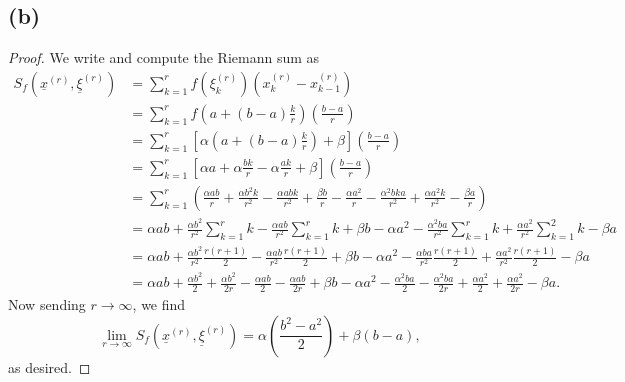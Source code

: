 \documentclass{article}
\begin{document}
\subsection*{(b)}
\begin{proof}
	We write and compute the Riemann sum as
	\begin{align}
		S_f\left(\underline{x}^{(r)}, \underline{\xi}^{(r)}\right) &= \sum_{k=1}^r f\left(\xi_k^{(r)}\right)\left(x_k^{(r)} - x_{k-1}^{(r)}\right) \\
		&= \sum_{k=1}^r f\left(a + (b-a)\frac{k}{r}\right)\left(\frac{b-a}{r}\right) \\
		&= \sum_{k=1}^r \left[\alpha \left(a + (b-a)\frac{k}{r}\right) + \beta\right]\left(\frac{b-a}{r}\right) \\
		&= \sum_{k=1}^r \left[\alpha a + \alpha \frac{bk}{r} - \alpha \frac{ak}{r} + \beta\right] \left(\frac{b-a}{r}\right) \\
		&= \sum_{k=1}^r \left(\frac{\alpha a b}{r} + \frac{\alpha b^2 k}{r^2} - \frac{\alpha a b k}{r^2} + \frac{\beta b}{r} - \frac{\alpha a^2}{r} - \frac{\alpha^2 b k a}{r^2} + \frac{\alpha a^2 k}{r^2} - \frac{\beta a}{r}\right)\\
		&= \alpha a b + \frac{\alpha b^2}{r^2}\sum_{k=1}^r k - \frac{\alpha a b}{r^2}\sum_{k=1}^r k + \beta b - \alpha a^2 - \frac{\alpha^2 b a}{r^2}\sum_{k=1}^r k + \frac{\alpha a^2}{r^2}\sum_{k=1}^2 k - \beta a \\
		&= \alpha a b + \frac{\alpha b^2}{r^2}\frac{r(r+1)}{2} - \frac{\alpha a b}{r^2}\frac{r(r+1)}{2} + \beta b - \alpha a^2 - \frac{\alpha b a}{r^2}\frac{r(r+1)}{2} + \frac{\alpha a^2}{r^2}\frac{r(r+1)}{2} - \beta a \\
		&= \alpha a b + \frac{\alpha b^2}{2} + \frac{\alpha b^2}{2 r} - \frac{\alpha a b}{2} - \frac{\alpha a b}{2 r} + \beta b - \alpha a^2 - \frac{\alpha^2 b a}{2} - \frac{\alpha^2 b a}{2 r} + \frac{\alpha a^2}{2} + \frac{\alpha a^2}{2r} - \beta a.
	\end{align}
	Now sending $r \to \infty$, we find
	\begin{equation}
		\lim\limits_{r \to \infty} S_f \left(\underline{x}^{(r)}, \underline{\xi}^{(r)}\right) = \alpha \left(\frac{b^2 - a^2}{2}\right) + \beta (b - a),
	\end{equation}
	as desired.
\end{proof}
\end{document}
